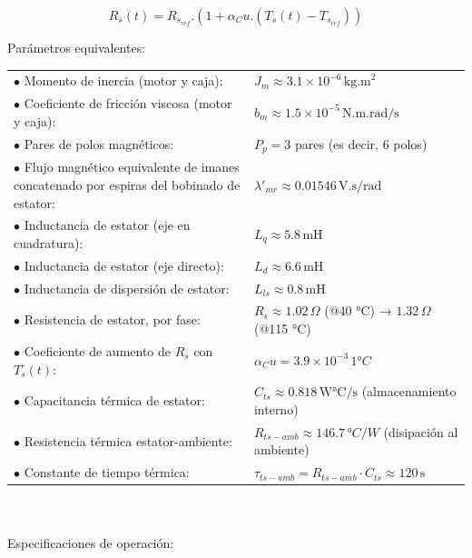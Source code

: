 \documentclass{article}
\begin{document}
    \begin{equation}\label{termico3}
        R_s(t) = R_{s_{ref}}.(1+\alpha_Cu.(T_s(t)-T_{s_{ref}}))
    \end{equation}

    \noindent Parámetros equivalentes:\\

    \begin{tabular}{@{} p{} p{} @{}}
        \(\bullet\) Momento de inercia (motor y caja): & \(J_m \approx 3.1 \times 10^{-6} \, \text{kg.m}^2\) \\
        \(\bullet\) Coeficiente de fricción viscosa (motor y caja): & \(b_m \approx 1.5 \times 10^{-5} \, \text{N.m.rad/s}\) \\
        \(\bullet\) Pares de polos magnéticos: & \(P_p = 3\) pares (es decir, 6 polos) \\
        \(\bullet\) Flujo magnético equivalente de imanes concatenado por espiras del bobinado de estator: & \(\lambda'_{mr} \approx 0.01546 \, \text{V.s/rad}\)\\
        \(\bullet\) Inductancia de estator (eje en cuadratura): & \(L_q \approx 5.8 \, \text{mH}\) \\
        \(\bullet\) Inductancia de estator (eje directo): & \(L_d \approx 6.6 \, \text{mH}\) \\
        \(\bullet\) Inductancia de dispersión de estator: & \(L_{ls} \approx 0.8 \, \text{mH}\) \\
        \(\bullet\) Resistencia de estator, por fase: & \(R_s \approx 1.02 \, \Omega\) (@40 °C) → \(1.32 \, \Omega\) (@115 °C) \\
        \(\bullet\) Coeficiente de aumento de \(R_s\) con \(T_s^\circ(t)\): & \(\alpha_Cu = 3.9 \times 10^{-3} \, 1°C\) \\
        \(\bullet\) Capacitancia térmica de estator: & \(C_{ts} \approx 0.818 \, \text{W°C/s}\) (almacenamiento interno) \\
        \(\bullet\) Resistencia térmica estator-ambiente: & \(R_{ts-amb} \approx 146.7 \, °C/W\) (disipación al ambiente) \\
        \(\bullet\) Constante de tiempo térmica: & \(\tau_{ts-amb} = R_{ts-amb} \cdot C_{ts} \approx 120 \, \text{s}\)
    \end{tabular}    
    \\\\
    Especificaciones de operación:\\
\end{document}
